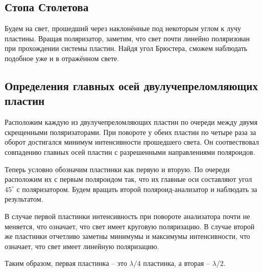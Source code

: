 \documentclass[12pt, a4paper]{article}
\begin{document}
\subsection{Стопа Столетова}
Будем на свет, прошедший через наклонённые под некоторым углом к лучу пластины.
Вращая поляризатор, заметим, что свет почти линейно поляризован при прохождении
системы пластин. Найдя угол Брюстера, сможем наблюдать подобное уже и в
отражённом свете.

\subsection{Определения главных осей двулучепреломляющих пластин}
Расположим каждую из двулучепреломляющих пластин по очереди между двумя
скрещенными поляризаторами. При повороте у обеих пластин по четыре раза за
оборот достигался минимум интенсивности прошедшего света. Он соотвествовал
совпадению главных осей пластин с разрешенными направлениями поляроидов.

Теперь условно обозначим пластинки как первую и вторую. По очереди расположим
их с первым поляроидом так, что их главные оси составляют угол $45^\circ$ с
поляризатором. Будем вращать второй поляроид-анализатор и наблюдать за
результатом.

В случае первой пластинки интенсивность при повороте анализатора почти не
меняется, что означает, что свет имеет круговую поляризацию. В случае второй же
пластинки отчетливо заметны минимумы и максимумы интенсивности, что означает,
что свет имеет линейную поляризацию.

Таким образом, первая пластинка -- это $\lambda/4$ пластинка, а вторая --
$\lambda/2$.
\end{document}
